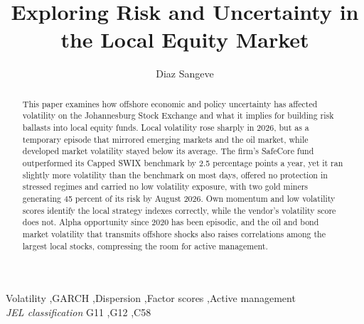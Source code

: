 \documentclass[11pt,preprint]{elsarticle}
\numberwithin{equation}{section}
\numberwithin{figure}{section}
\numberwithin{table}{section}
\begin{document}
\begin{frontmatter}  %

\title{Exploring Risk and Uncertainty in the Local Equity Market}





\author[Add1]{Diaz Sangeve}





\address[Add1]{Stellenbosch University, Stellenbosch, South Africa}


\begin{abstract}
\small{
This paper examines how offshore economic and policy uncertainty has
affected volatility on the Johannesburg Stock Exchange and what it
implies for building risk ballasts into local equity funds. Local
volatility rose sharply in 2026, but as a temporary episode that
mirrored emerging markets and the oil market, while developed market
volatility stayed below its average. The firm's SafeCore fund
outperformed its Capped SWIX benchmark by 2.5 percentage points a year,
yet it ran slightly more volatility than the benchmark on most days,
offered no protection in stressed regimes and carried no low volatility
exposure, with two gold miners generating 45 percent of its risk by
August 2026. Own momentum and low volatility scores identify the local
strategy indexes correctly, while the vendor's volatility score does
not. Alpha opportunity since 2020 has been episodic, and the oil and
bond market volatility that transmits offshore shocks also raises
correlations among the largest local stocks, compressing the room for
active management.
}
\end{abstract}

\vspace{1cm}


\begin{keyword}
\footnotesize{
Volatility \sep GARCH \sep Dispersion \sep Factor scores \sep Active
management \\
\vspace{0.3cm}
}
\footnotesize{
\textit{JEL classification} G11 \sep G12 \sep C58
}
\end{keyword}



\vspace{0.5cm}

\end{frontmatter}
\end{document}
